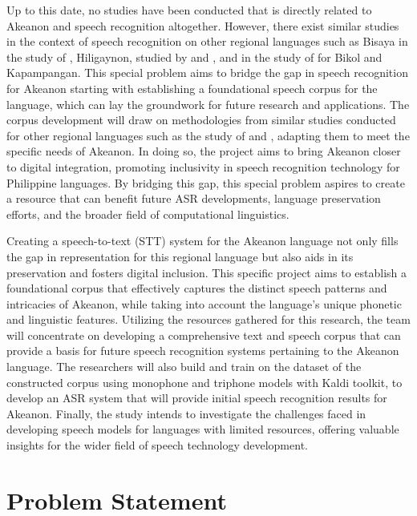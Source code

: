 Up to this date, no studies have been conducted that is directly related to Akeanon and speech recognition altogether. However, there exist similar studies in the context of speech recognition on other regional languages such as Bisaya in the study of , Hiligaynon, studied by  and , and in the study of  for Bikol and Kapampangan. This special problem aims to bridge the gap in speech recognition for Akeanon starting with establishing a foundational speech corpus for the language, which can lay the groundwork for future research and applications. The corpus development will draw on methodologies from similar studies conducted for other regional languages such as the study of  and , adapting them to meet the specific needs of Akeanon. In doing so, the project aims to bring Akeanon closer to digital integration, promoting inclusivity in speech recognition technology for Philippine languages. By bridging this gap, this special problem aspires to create a resource that can benefit future ASR developments, language preservation efforts, and the broader field of computational linguistics.

Creating a speech-to-text (STT) system for the Akeanon language not only fills the gap in representation for this regional language but also aids in its preservation and fosters digital inclusion. This specific project aims to establish a foundational corpus that effectively captures the distinct speech patterns and intricacies of Akeanon, while taking into account the language's unique phonetic and linguistic features. Utilizing the resources gathered for this research, the team will concentrate on developing a comprehensive text and speech corpus that can provide a basis for future speech recognition systems pertaining to the Akeanon language. The researchers will also build and train on the dataset of the constructed corpus using monophone and triphone models with Kaldi toolkit, to develop an ASR system that will provide initial speech recognition results for Akeanon. Finally, the study intends to investigate the challenges faced in developing speech models for languages with limited resources, offering valuable insights for the wider field of speech technology development.


\section{Problem Statement}
\label{sec:problemstatement}

